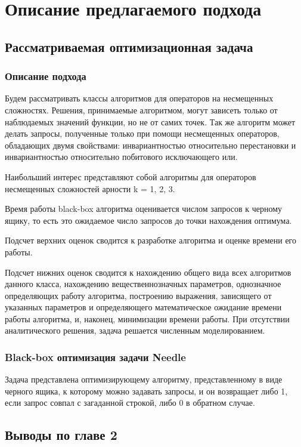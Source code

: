 \chapter{Описание предлагаемого подхода}
\label{chapter2}

\section{Рассматриваемая оптимизационная задача}
\subsection{Описание подхода}
Будем рассматривать классы алгоритмов для операторов на несмещенных сложностях. Решения, принимаемые алгоритмом, могут зависеть только от наблюдаемых значений функции, но не от самих точек. Так же алгоритм может делать  запросы, полученные только при помощи несмещенных операторов, обладающих двумя свойствами: инвариантностью относительно перестановки и инвариантностью относительно побитового исключающего или.
	
Наибольший интерес представляют собой алгоритмы для операторов  несмещенных сложностей арности k = 1, 2, 3.

Время работы black-box алгоритма оценивается числом запросов к черному ящику,  то есть это ожидаемое число запросов до точки  нахождения оптимума.
	
Подсчет верхних оценок сводится к разработке алгоритма и оценке времени его работы.
	
Подсчет нижних оценок сводится к нахождению общего вида всех алгоритмов данного класса, нахождению вещественнозначных параметров, однозначное определяющих работу алгоритма, построению выражения, зависящего от указанных параметров и определяющего математическое ожидание времени работы алгоритма, и, наконец, минимизации времени работы. При отсутствии аналитического решения, задача решается численным моделированием. 
\subsection{Black-box оптимизация задачи Needle}

Задача представлена оптимизирующему алгоритму, представленному в виде черного ящика, к  которому можно задавать запросы, и он возвращает либо 1, если запрос  совпал с загаданной строкой, либо 0 в обратном случае.

\section{Выводы по главе 2}




